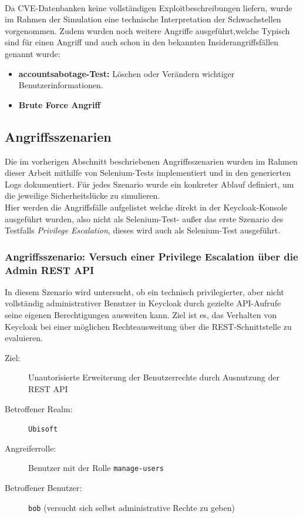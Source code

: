 \documentclass[a4paper,12pt]{article}
\begin{document}
	\\[0.5em]
	Da CVE-Datenbanken keine vollständigen Exploitbeschreibungen liefern, wurde im Rahmen der Simulation eine technische Interpretation der Schwachstellen vorgenommen. Zudem wurden noch weitere Angriffe ausgeführt,welche Typisch sind für einen Angriff und auch schon in den bekannten Insiderangriffsfällen genannt wurde:
	\begin{itemize}
		\item \textbf{\gls{accountsabotage}-Test: }  
		Löschen oder Verändern wichtiger Benutzerinformationen.
		\item \textbf{Brute Force Angriff}
	\end{itemize}

	\subsection{Angriffsszenarien}                         
	Die im vorherigen Abschnitt beschriebenen Angriffsszenarien wurden im Rahmen dieser Arbeit mithilfe von Selenium-Tests implementiert und in den generierten Logs dokumentiert. Für jedes Szenario wurde ein konkreter Ablauf definiert, um die jeweilige Sicherheitslücke zu simulieren.
	\\[0.5em]
	Hier werden die Angriffsfälle aufgelistet welche direkt in der Keycloak-Konsole ausgeführt wurden, also nicht als Selenium-Test- außer das erste Szenario des Testfalls \textit{Privilege Escalation}, dieses wird auch als Selenium-Test ausgeführt.
	
	\subsubsection{Angriffsszenario: Versuch einer Privilege Escalation über die Admin REST API}
	
	In diesem Szenario wird untersucht, ob ein technisch privilegierter, aber nicht vollständig administrativer Benutzer in Keycloak durch gezielte API-Aufrufe seine eigenen Berechtigungen ausweiten kann. Ziel ist es, das Verhalten von Keycloak bei einer möglichen Rechteausweitung über die REST-Schnittstelle zu evaluieren.
	
	\begin{description}
		\item[Ziel:] Unautorisierte Erweiterung der Benutzerrechte durch Ausnutzung der REST API
		\item[Betroffener Realm:] \texttt{Ubisoft}
		\item[Angreiferrolle:] Benutzer mit der Rolle \texttt{manage-users}
		\item[Betroffener Benutzer:] \texttt{bob} (versucht sich selbst administrative Rechte zu geben)
	\end{description}
	
\end{document}
